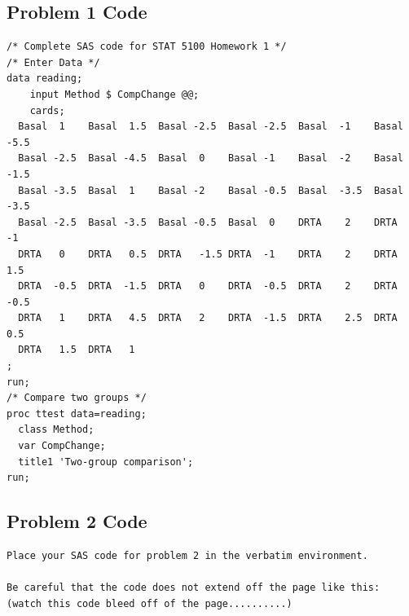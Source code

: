 \documentclass[12pt]{article}
\begin{document}
\subsection*{Problem 1 Code}
\begin{verbatim}
/* Complete SAS code for STAT 5100 Homework 1 */ 
/* Enter Data */
data reading;
	input Method $ CompChange @@;
	cards;
  Basal  1    Basal  1.5  Basal -2.5  Basal -2.5  Basal  -1    Basal  -5.5
  Basal -2.5  Basal -4.5  Basal  0    Basal -1    Basal  -2    Basal  -1.5
  Basal -3.5  Basal  1    Basal -2    Basal -0.5  Basal  -3.5  Basal  -3.5
  Basal -2.5  Basal -3.5  Basal -0.5  Basal  0    DRTA    2    DRTA   -1
  DRTA   0    DRTA   0.5  DRTA   -1.5 DRTA  -1    DRTA    2    DRTA    1.5
  DRTA  -0.5  DRTA  -1.5  DRTA   0    DRTA  -0.5  DRTA    2    DRTA   -0.5
  DRTA   1    DRTA   4.5  DRTA   2    DRTA  -1.5  DRTA    2.5  DRTA    0.5
  DRTA   1.5  DRTA   1
;
run;
/* Compare two groups */
proc ttest data=reading;
  class Method;
  var CompChange;
  title1 'Two-group comparison';
run;

\end{verbatim}


\subsection*{Problem 2 Code}
\begin{verbatim}
Place your SAS code for problem 2 in the verbatim environment. 

Be careful that the code does not extend off the page like this: (watch this code bleed off of the page..........)
\end{verbatim}

\end{document}
